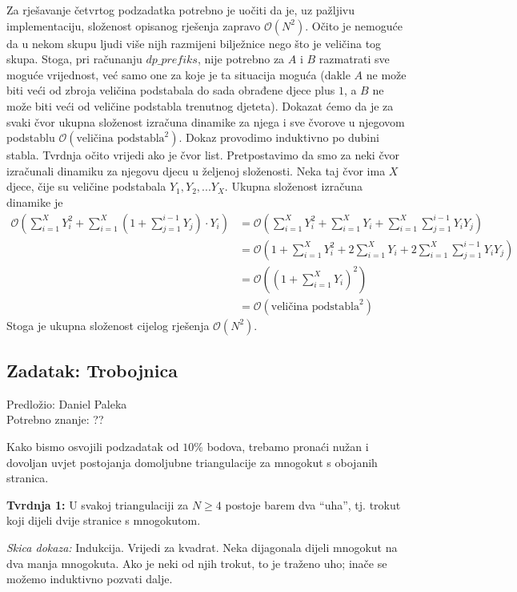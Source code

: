 \documentclass[a4paper]{article}
\begin{document}
Za rješavanje četvrtog podzadatka potrebno je uočiti da je, uz pažljivu implementaciju,
složenost opisanog rješenja zapravo $\mathcal{O}(N^2)$. Očito je nemoguće da u nekom skupu
ljudi više nijh razmijeni bilježnice nego što je veličina tog skupa. Stoga, pri računanju
$dp\_prefiks$, nije potrebno za $A$ i $B$ razmatrati sve moguće vrijednost, već samo one za
koje je ta situacija moguća (dakle $A$ ne može biti veći od zbroja veličina podstabala do sada
obrađene djece plus $1$, a $B$ ne može biti veći od veličine podstabla trenutnog djeteta).
Dokazat ćemo da je za svaki čvor ukupna složenost izračuna dinamike za njega i sve čvorove u
njegovom podstablu $\mathcal{O}(\text{veličina podstabla}^2)$. Dokaz provodimo induktivno po
dubini stabla. Tvrdnja očito vrijedi ako je čvor list. Pretpostavimo da smo za neki čvor
izračunali dinamiku za njegovu djecu u željenoj složenosti. Neka taj čvor ima $X$ djece,
čije su veličine podstabala $Y_1, Y_2, ... Y_X$. Ukupna složenost izračuna dinamike je
\begin{align*}
    \mathcal{O} \left( \sum_{i=1}^{X} Y_i^2 +
    \sum_{i=1}^{X}(1 + \sum_{j=1}^{i-1}Y_j) \cdot Y_i \right)
    &= \mathcal{O} \left( \sum_{i=1}^{X}Y_i^2 + \sum_{i=1}^{X}Y_i +
    \sum_{i=1}^{X}\sum_{j=1}^{i-1}Y_i Y_j \right) \\
    &= \mathcal{O} \left( 1 + \sum_{i=1}^{X}Y_i^2 + 2\sum_{i=1}^{X}Y_i +
    2\sum_{i=1}^{X}\sum_{j=1}^{i-1}Y_i Y_j \right) \\
    &= \mathcal{O} \left( (1 + \sum_{i=1}^X Y_i)^2 \right) \\
    &= \mathcal{O} (\text{veličina podstabla}^2) 
\end{align*}
Stoga je ukupna složenost cijelog rješenja $\mathcal{O}(N^2)$.

\subsection*{Zadatak: Trobojnica}
\textsf{Predložio: Daniel Paleka}\\
\textsf{Potrebno znanje: ??}

Kako bismo osvojili podzadatak od $10\%$ bodova, trebamo pronaći nužan i dovoljan uvjet postojanja
domoljubne triangulacije za mnogokut s obojanih stranica.

\textbf{Tvrdnja 1: } \; U svakoj triangulaciji za $N \ge 4$ postoje barem dva ``uha'', tj. trokut
koji dijeli dvije stranice s mnogokutom.

\emph{Skica dokaza: } \; Indukcija. Vrijedi za kvadrat.
Neka dijagonala dijeli mnogokut na dva manja mnogokuta. Ako je neki od njih trokut, to je traženo uho;
inače se možemo induktivno pozvati dalje.
\end{document}
